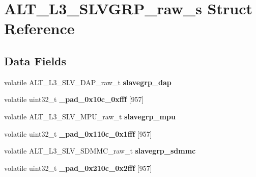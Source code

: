 \hypertarget{structALT__L3__SLVGRP__raw__s}{}\section{A\+L\+T\+\_\+\+L3\+\_\+\+S\+L\+V\+G\+R\+P\+\_\+raw\+\_\+s Struct Reference}
\label{structALT__L3__SLVGRP__raw__s}
\subsection*{Data Fields}
\begin{DoxyCompactItemize}
\item 
\mbox{\label{structALT__L3__SLVGRP__raw__s_af320696cabe67c7ab0792f3f2c5d6f93}} 
volatile A\+L\+T\+\_\+\+L3\+\_\+\+S\+L\+V\+\_\+\+D\+A\+P\+\_\+raw\+\_\+t {\bfseries slavegrp\+\_\+dap}
\item 
\mbox{\label{structALT__L3__SLVGRP__raw__s_a2ff78c915f1fe387d16256870bfe6608}} 
volatile uint32\+\_\+t {\bfseries \+\_\+pad\+\_\+0x10c\+\_\+0xfff} \mbox{[}957\mbox{]}
\item 
\mbox{\label{structALT__L3__SLVGRP__raw__s_a6838cdc15d8ca3f7adb6ac703ee9582e}} 
volatile A\+L\+T\+\_\+\+L3\+\_\+\+S\+L\+V\+\_\+\+M\+P\+U\+\_\+raw\+\_\+t {\bfseries slavegrp\+\_\+mpu}
\item 
\mbox{\label{structALT__L3__SLVGRP__raw__s_a8228fe09529f78af9ff8bd1358dd55a3}} 
volatile uint32\+\_\+t {\bfseries \+\_\+pad\+\_\+0x110c\+\_\+0x1fff} \mbox{[}957\mbox{]}
\item 
\mbox{\label{structALT__L3__SLVGRP__raw__s_ae30b1a5e10a2cbfeb6aefced002d4117}} 
volatile A\+L\+T\+\_\+\+L3\+\_\+\+S\+L\+V\+\_\+\+S\+D\+M\+M\+C\+\_\+raw\+\_\+t {\bfseries slavegrp\+\_\+sdmmc}
\item 
\mbox{\label{structALT__L3__SLVGRP__raw__s_a418e32386ead0d142e431093d023f526}} 
volatile uint32\+\_\+t {\bfseries \+\_\+pad\+\_\+0x210c\+\_\+0x2fff} \mbox{[}957\mbox{]}
\item 
\mbox{\label{structALT__L3__SLVGRP__raw__s_a9808a0a9aeaa7da203e9f282b694a50b}} 

\end{DoxyCompactItemize}
